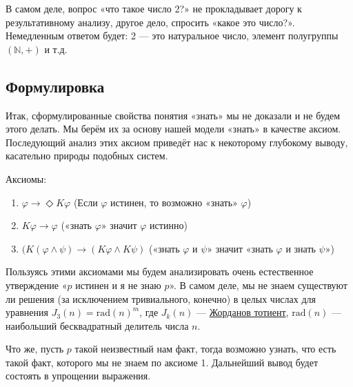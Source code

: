 \documentclass[openany]{book}
\theoremstyle{plain}
\theoremstyle{definition}
\begin{document}
В самом деле, вопрос «что такое число 2?» не прокладывает дорогу к результативному анализу, другое дело, спросить «какое это число?». Немедленным ответом будет: 2 — это натуральное число, элемент полугруппы \((\mathbb{N}, +)\) и т.д.

\subsection{ Формулировка }

Итак, сформулированные свойства понятия «знать» мы не доказали и не будем этого делать. Мы берём их за основу нашей модели «знать» в качестве аксиом. Последующий анализ этих аксиом приведёт нас к некоторому глубокому выводу, касательно природы подобных систем.

Аксиомы:
\begin{enumerate}
    \item \(\varphi \to \Diamond K \varphi\) (Если \(\varphi\) истинен, то возможно «знать» \(\varphi\))
    \item \(K\varphi \to \varphi\) («знать \(\varphi\)» значит \(\varphi\) истинно)
    \item \((K(\varphi \land \psi) \to (K\varphi \land K\psi)\) («знать \(\varphi\) и \(\psi\)» значит «знать \(\varphi\) и знать \(\psi\)»)
\end{enumerate}

Пользуясь этими аксиомами мы будем анализировать очень естественное утверждение «\(p\) истинен и я не знаю \(p\)». В самом деле, мы не знаем существуют ли решения (за исключением тривиального, конечно) в целых числах для уравнения \(J_3(n) = \mathrm{rad}(n)^m\), где \(J_k(n)\) — \href{https://ru.wikipedia.org/wiki/Жорданов_тотиент}{Жорданов тотиент}, \(\mathrm{rad}(n)\) — наибольший бесквадратный делитель числа \(n\).

Что же, пусть \(p\) такой неизвестный нам факт, тогда возможно узнать, что есть такой факт, которого мы не знаем по аксиоме 1. Дальнейший вывод будет состоять в упрощении выражения.
\end{document}
